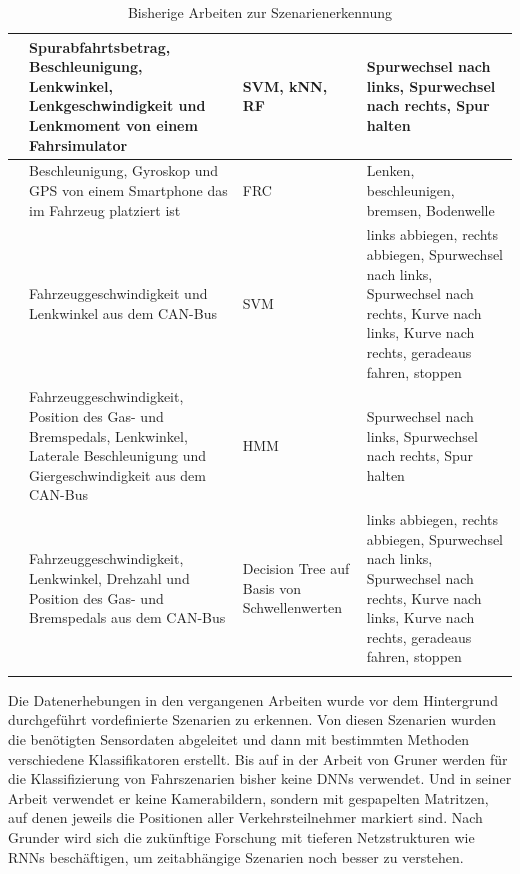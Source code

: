 \begin{longtable}[c]{p{} p{4.5cm} p{} p{4.5cm}}
\cite{zheng2016drivers} & Spurabfahrtsbetrag, Beschleunigung, Lenkwinkel, Lenkgeschwindigkeit und Lenkmoment von einem Fahrsimulator & \ac{SVM}, \ac{kNN}, \ac{RF} & Spurwechsel nach links, Spurwechsel nach rechts, Spur halten \\
\hline

\cite{arroyo2016adaptive} & Beschleunigung, Gyroskop und GPS von einem Smartphone das im Fahrzeug platziert ist & \ac{FRC} & Lenken, beschleunigen, bremsen, Bodenwelle \\
\hline

\cite{zheng2015non} & Fahrzeuggeschwindigkeit und Lenkwinkel aus dem CAN-Bus & \ac{SVM} & links abbiegen, rechts abbiegen, Spurwechsel nach links, Spurwechsel nach rechts, Kurve nach links, Kurve nach rechts, geradeaus fahren, stoppen \\
\hline

\cite{li2015lane} & Fahrzeuggeschwindigkeit, Position des Gas- und Bremspedals, Lenkwinkel, Laterale Beschleunigung und Giergeschwindigkeit aus dem CAN-Bus & \ac{HMM} & Spurwechsel nach links, Spurwechsel nach rechts, Spur halten \\
\hline

\cite{zheng2014threshold} & Fahrzeuggeschwindigkeit, Lenkwinkel, Drehzahl und Position des Gas- und Bremspedals aus dem CAN-Bus & Decision Tree auf Basis von Schwellenwerten & links abbiegen, rechts abbiegen, Spurwechsel nach links, Spurwechsel nach rechts, Kurve nach links, Kurve nach rechts, geradeaus fahren, stoppen \\

\hline
\caption{Bisherige Arbeiten zur Szenarienerkennung}
\label{tab_szenarienerkennung}
\end{longtable}

Die Datenerhebungen in den vergangenen Arbeiten wurde vor dem Hintergrund durchgeführt vordefinierte Szenarien zu erkennen. Von diesen Szenarien wurden die benötigten Sensordaten abgeleitet und dann mit bestimmten Methoden verschiedene Klassifikatoren erstellt. Bis auf in der Arbeit von Gruner \cite{gruner2017spatiotemporal} werden für die Klassifizierung von Fahrszenarien bisher keine \acp{DNN} verwendet. Und in seiner Arbeit verwendet er keine Kamerabildern, sondern mit gespapelten Matritzen, auf denen jeweils die Positionen aller Verkehrsteilnehmer markiert sind. Nach Grunder \cite{gruner2017spatiotemporal} wird sich die zukünftige Forschung mit tieferen Netzstrukturen wie \acp{RNN} beschäftigen, um zeitabhängige Szenarien noch besser zu verstehen.

